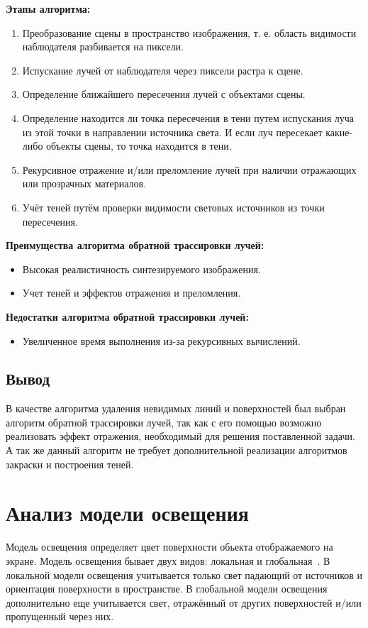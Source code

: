 \textbf{Этапы алгоритма:}
\begin{enumerate}[label=\arabic*)]
	\item Преобразование сцены в пространство изображения, т. е. область видимости наблюдателя разбивается на пиксели.
	\item Испускание лучей от наблюдателя через пиксели растра к сцене.
	\item Определение ближайшего пересечения лучей с объектами сцены.
	\item Определение находится ли точка пересечения в тени путем испускания луча из этой точки в направлении источника света. И если луч пересекает какие-либо объекты сцены, то точка находится в тени.
	\item Рекурсивное отражение и/или преломление лучей при наличии отражающих или прозрачных материалов.
	\item Учёт теней путём проверки видимости световых источников из точки пересечения.
\end{enumerate}

\textbf{Преимущества алгоритма обратной трассировки лучей:}
\begin{itemize}
	\item Высокая реалистичность синтезируемого изображения.
	\item Учет теней и эффектов отражения и преломления.
\end{itemize}

\textbf{Недостатки алгоритма обратной трассировки лучей:}
\begin{itemize}
	\item Увеличенное время выполнения из-за рекурсивных вычислений.
\end{itemize}

\subsection*{Вывод}
В качестве алгоритма удаления невидимых линий и поверхностей был выбран алгоритм обратной трассировки лучей, так как с его помощью возможно реализовать эффект отражения, необходимый для решения поставленной задачи. А так же данный алгоритм не требует дополнительной реализации алгоритмов закраски и построения теней.

\clearpage
\section{Анализ модели освещения}
Модель освещения определяет цвет поверхности обьекта отображаемого на экране. Модель освещения бывает двух видов: локальная и глобальная~\cite{rodgersCG}. В локальной модели освещения учитывается только свет падающий от источников и ориентация поверхности в пространстве. В глобальной модели освещения дополнительно еще учитывается свет, отражённый от других поверхностей и/или пропущенный через них.

